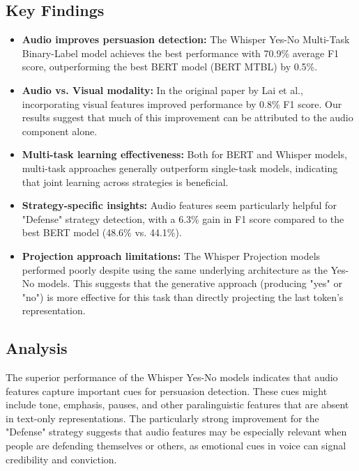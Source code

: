 \documentclass{article}
\begin{document}
\subsection{Key Findings}
\begin{itemize}
    \item \textbf{Audio improves persuasion detection:} The Whisper Yes-No Multi-Task Binary-Label model achieves the best performance with 70.9\% average F1 score, outperforming the best BERT model (BERT MTBL) by 0.5\%.
    
    \item \textbf{Audio vs. Visual modality:} In the original paper by Lai et al., incorporating visual features improved performance by 0.8\% F1 score. Our results suggest that much of this improvement can be attributed to the audio component alone.
    
    \item \textbf{Multi-task learning effectiveness:} Both for BERT and Whisper models, multi-task approaches generally outperform single-task models, indicating that joint learning across strategies is beneficial.
    
    \item \textbf{Strategy-specific insights:} Audio features seem particularly helpful for "Defense" strategy detection, with a 6.3\% gain in F1 score compared to the best BERT model (48.6\% vs. 44.1\%).
    
    \item \textbf{Projection approach limitations:} The Whisper Projection models performed poorly despite using the same underlying architecture as the Yes-No models. This suggests that the generative approach (producing "yes" or "no") is more effective for this task than directly projecting the last token's representation.
\end{itemize}

\subsection{Analysis}
The superior performance of the Whisper Yes-No models indicates that audio features capture important cues for persuasion detection. These cues might include tone, emphasis, pauses, and other paralinguistic features that are absent in text-only representations. The particularly strong improvement for the "Defense" strategy suggests that audio features may be especially relevant when people are defending themselves or others, as emotional cues in voice can signal credibility and conviction.
\end{document}
